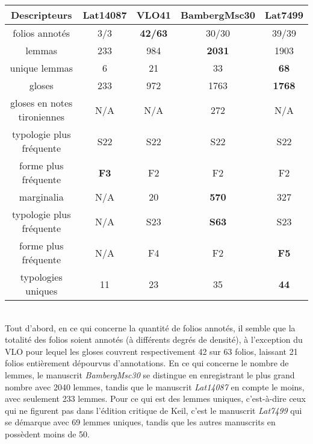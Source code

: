 \documentclass[a4paper, twoside, 12pt]{book}
\begin{document}
{\begin{tabular}{|c|c|c|c|c|}
\hline
 Descripteurs & Lat14087 & VLO41 & BambergMsc30 & Lat7499 \\
\hline
folios annotés & 3/3 & \textbf{42/63} & 30/30 & 39/39 \\
lemmas & 233 & 984 & \textbf{2031} & 1903 \\
unique lemmas & 6 & 21 & 33 & \textbf{68} \\
\hline\hline
gloses & 233 & 972 & 1763 & \textbf{1768} \\
gloses en notes tironiennes & N/A & N/A & 272 & N/A \\
typologie plus fréquente & S22 & S22 & S22 & S22 \\
forme plus fréquente & \textbf{F3} & F2 & F2 & F2 \\
marginalia & N/A & 20 & \textbf{570} & 327 \\
typologie plus fréquente & N/A & S23 & \textbf{S63} & S23 \\
forme plus fréquente & N/A & F4 & F2 & \textbf{F5} \\
\hline\hline
typologies uniques & 11 & 23 & 35 & \textbf{44} \\
\hline
\end{tabular} \\

Tout d'abord, en ce qui concerne la quantité de folios annotés, il semble que la totalité des folios soient annotés (à différents degrés de densité), à l'exception du VLO pour lequel les gloses couvrent respectivement 42 sur 63 folios, laissant 21 folios entièrement dépourvus d'annotations. En ce qui concerne le nombre de lemmes, le manuscrit \textit{BambergMsc30} se distingue en enregistrant le plus grand nombre avec 2040 lemmes, tandis que le manuscrit \textit{Lat14087} en compte le moins, avec seulement 233 lemmes. Pour ce qui est des lemmes uniques, c'est-à-dire ceux qui ne figurent pas dans l'édition critique de Keil, c'est le manuscrit \textit{Lat7499} qui se démarque avec 69 lemmes uniques, tandis que les autres manuscrits en possèdent moins de 50.\\

}
\end{document}
